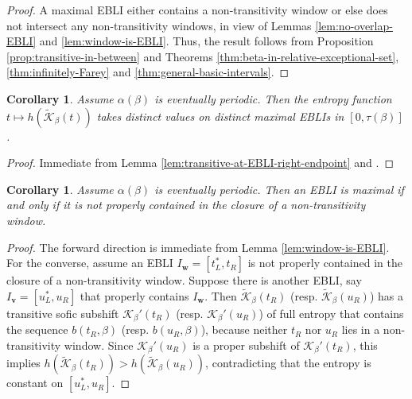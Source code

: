 \documentclass[11pt]{amsart}
\newtheorem{corollary}[theorem]{Corollary}
\theoremstyle{definition}
\theoremstyle{remark}
\numberwithin{equation}{section}
\newcommand{\Kt}{\widetilde{\mathcal{K}}}
\renewcommand{\v}{\mathbf{v}}
\newcommand{\w}{\mathbf{w}}
\newcommand{\al}{\alpha}
\begin{document}
\begin{proof}
A maximal EBLI either contains a non-transitivity window or else does not intersect any non-transitivity windows, in view of Lemmas \ref{lem:no-overlap-EBLI} and \ref{lem:window-is-EBLI}. Thus, the result follows from Proposition \ref{prop:transitive-in-between} and Theorems \ref{thm:beta-in-relative-exceptional-set}, \ref{thm:infinitely-Farey} and \ref{thm:general-basic-intervals}.
\end{proof}

\begin{corollary} \label{cor:entropy-different}
Assume $\al(\beta)$ is eventually periodic. Then the entropy function $t\mapsto h(\Kt_\beta(t))$ takes distinct values on distinct maximal EBLIs in $[0,\tau(\beta)]$.
\end{corollary}

\begin{proof}
Immediate from Lemma \ref{lem:transitive-at-EBLI-right-endpoint} and \cite[Corollary 4.4.9]{Lind_Marcus_1995}.
\end{proof}

\begin{corollary} \label{cor:maximal-EBLI}
Assume $\al(\beta)$ is eventually periodic. Then an EBLI is maximal if and only if it is not properly contained in the closure of a non-transitivity window.
\end{corollary}

\begin{proof}
The forward direction is immediate from Lemma \ref{lem:window-is-EBLI}. For the converse, assume an EBLI $I_\w=[t_L^*,t_R]$ is not properly contained in the closure of a non-transitivity window. Suppose there is another EBLI, say $I_\v=[u_L^*,u_R]$ that properly contains $I_\w$. Then $\Kt_\beta(t_R)$ (resp. $\Kt_\beta(u_R)$) has a transitive sofic subshift $\mathcal{K}_\beta'(t_R)$ (resp. $\mathcal{K}_\beta'(u_R)$) of full entropy that contains the sequence $b(t_R,\beta)$ (resp. $b(u_R,\beta)$), because neither $t_R$ nor $u_R$ lies in a non-transitivity window. Since $\mathcal{K}_\beta'(u_R)$ is a proper subshift of $\mathcal{K}_\beta'(t_R)$, this implies $h(\Kt_\beta(t_R))>h(\Kt_\beta(u_R))$, contradicting that the entropy is constant on $[u_L^*,u_R]$.
\end{proof}
\end{document}
